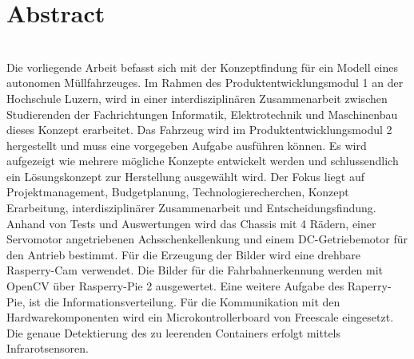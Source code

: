 \section{Abstract}\\[0.2cm]
Die vorliegende Arbeit befasst sich mit der Konzeptfindung für ein Modell eines autonomen Müllfahrzeuges. Im Rahmen des Produktentwicklungsmodul 1 an der Hochschule Luzern, wird in einer interdisziplinären Zusammenarbeit zwischen Studierenden der Fachrichtungen Informatik, Elektrotechnik und Maschinenbau dieses Konzept erarbeitet. Das Fahrzeug wird im Produktentwicklungsmodul 2 hergestellt und muss eine vorgegeben Aufgabe ausführen können. Es wird aufgezeigt wie mehrere mögliche Konzepte entwickelt werden und schlussendlich ein Lösungskonzept zur Herstellung ausgewählt wird. Der Fokus liegt auf Projektmanagement, Budgetplanung, Technologierecherchen, Konzept Erarbeitung, interdisziplinärer Zusammenarbeit und Entscheidungsfindung. Anhand von Tests und Auswertungen wird das Chassis mit 4 Rädern, einer Servomotor angetriebenen Achsschenkellenkung und einem DC-Getriebemotor für den Antrieb bestimmt. Für die Erzeugung der Bilder wird eine drehbare Rasperry-Cam verwendet. Die Bilder für die Fahrbahnerkennung werden mit OpenCV über Rasperry-Pie 2 ausgewertet. Eine weitere Aufgabe des Raperry-Pie, ist die Informationsverteilung. Für die Kommunikation mit den Hardwarekomponenten wird ein Microkontrollerboard von Freescale eingesetzt. Die genaue Detektierung des zu leerenden Containers erfolgt mittels Infrarotsensoren.  
\clearpage